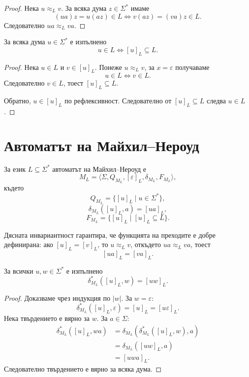 \begin{proof}
Нека $u\approx_L v$. За всяка дума $z\in\Sigma^*$ имаме
\[
(ua)z=u(az)\in L
\Longleftrightarrow
v(az)=(va)z\in L.
\]
Следователно $ua\approx_L va$.
\end{proof}

\begin{prop}
За всяка дума $u\in\Sigma^*$ е изпълнено
\[
u\in L\Longleftrightarrow [u]_L\subseteq L.
\]
\end{prop}

\begin{proof}
Нека $u\in L$ и $v\in[u]_L$. Понеже $u\approx_L v$, за $x=\varepsilon$ получаваме
\[
u\in L\Longleftrightarrow v\in L.
\]
Следователно $v\in L$, тоест $[u]_L\subseteq L$.

Обратно, $u\in[u]_L$ по рефлексивност. Следователно от $[u]_L\subseteq L$ следва $u\in L$.
\end{proof}

\section{Автоматът на Майхил--Нероуд}\label{s:4.6}

\begin{defn}
За език $L\subseteq\Sigma^*$ автоматът на Майхил--Нероуд е
\[
M_L=
\langle
\Sigma,Q_{M_L},[\varepsilon]_L,\delta_{M_L},F_{M_L}
\rangle,
\]
където
\[
Q_{M_L}=\{[u]_L\mid u\in\Sigma^*\},
\]
\[
\delta_{M_L}([u]_L,a)=[ua]_L,
\]
\[
F_{M_L}=\{[u]_L\mid [u]_L\subseteq L\}.
\]
\end{defn}

Дясната инвариантност гарантира, че функцията на преходите е добре дефинирана: ако $[u]_L=[v]_L$, то $u\approx_L v$, откъдето $ua\approx_L va$, тоест
\[
[ua]_L=[va]_L.
\]

\begin{prop}
За всички $u,w\in\Sigma^*$ е изпълнено
\[
\delta_{M_L}^*([u]_L,w)=[uw]_L.
\]
\end{prop}

\begin{proof}
Доказваме чрез индукция по $|w|$. За $w=\varepsilon$:
\[
\delta_{M_L}^*([u]_L,\varepsilon)=[u]_L=[u\varepsilon]_L.
\]
Нека твърдението е вярно за $w$. За $a\in\Sigma$:
\[
\begin{aligned}
\delta_{M_L}^*([u]_L,wa)
&=\delta_{M_L}(\delta_{M_L}^*([u]_L,w),a)\\
&=\delta_{M_L}([uw]_L,a)\\
&=[uwa]_L.
\end{aligned}
\]
Следователно твърдението е вярно за всяка дума.
\end{proof}

